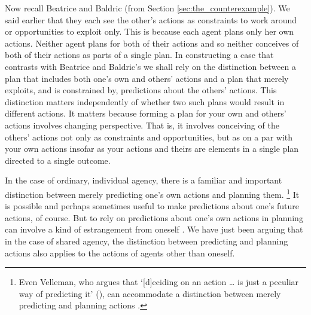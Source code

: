 \documentclass[12pt,\papersize]{extarticle}
\begin{document}
Now recall Beatrice and Baldric (from Section \vref{sec:the_counterexample}).
We said earlier that  they each see the other's actions  as constraints to work around or opportunities to exploit only.
This is because each agent plans only her own actions.
Neither agent plans for both of their actions and so neither conceives of both of their actions as parts of a single plan.
In constructing a case that contrasts with Beatrice and Baldric's we shall rely on the distinction between
a plan that includes both one's own and others' actions
and 
a plan that merely exploits, and is constrained by, predictions about the others' actions.
This distinction matters independently of whether two such plans would result in different actions.
It matters because 
forming a plan for your own and others' actions 
	involves changing perspective.
That is, it involves conceiving of the others' actions not only as constraints and opportunities, but as on a par with your own actions insofar as your actions and theirs are elements in a single plan directed to a single outcome.

In the case of ordinary, individual agency,
there is a familiar and  important distinction between merely predicting one's own actions and planning them.%
%
\footnote{
Even Velleman, who argues that `[d]eciding on an action … is just a peculiar way of predicting it' (\citeyear[p.\ 48]{Velleman:1985mc}), can accommodate a distinction between merely predicting and planning actions \citep[see][p.\ 195]{Velleman:2000fq}.
}
%
It is possible and perhaps sometimes useful to make predictions about one's future actions, of course.
But to rely on predictions about one's own actions in planning can involve a kind of estrangement from oneself \citep[compare][]{Moran:2001hr}.
We have just been arguing that 
in the case of shared agency,
the distinction between predicting and planning actions also applies to the actions of agents other than oneself.
\end{document}
